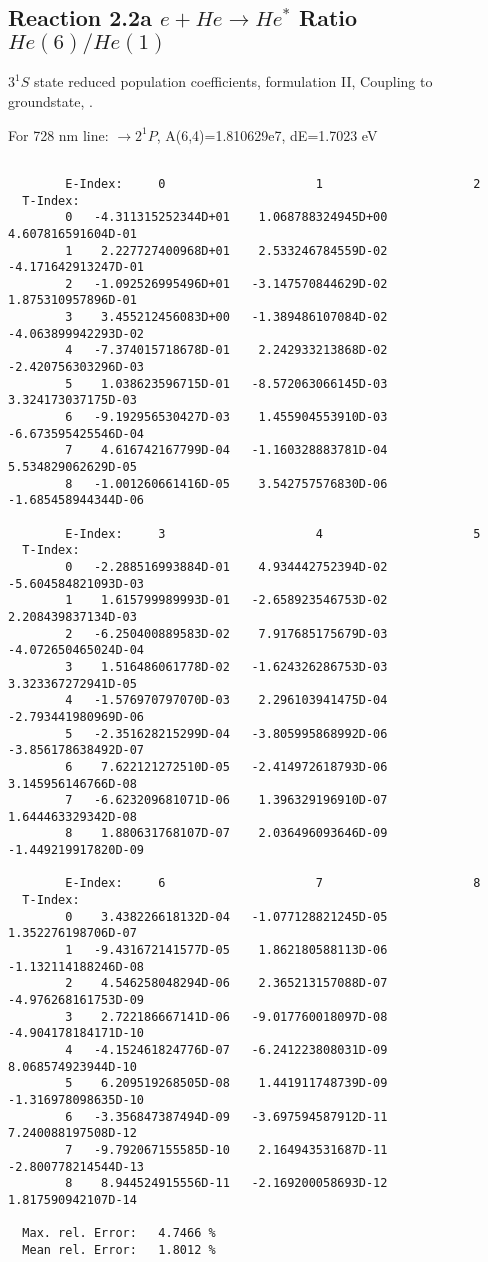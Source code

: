 \documentclass[12pt,dvipdfmx]{article}
\begin{document}
\subsection{
  Reaction 2.2a $e + He \rightarrow He^*  $ Ratio $He(6)/He(1)$
}

  $3^1S$ state
  reduced population coefficients, formulation II,
  Coupling to groundstate, \cite{kn:Fujimoto}.

  For 728 nm line:  $\rightarrow 2^1P$, A(6,4)=1.810629e7, dE=1.7023 eV

\begin{small}\begin{verbatim}

        E-Index:     0                     1                     2
  T-Index:
        0   -4.311315252344D+01    1.068788324945D+00    4.607816591604D-01
        1    2.227727400968D+01    2.533246784559D-02   -4.171642913247D-01
        2   -1.092526995496D+01   -3.147570844629D-02    1.875310957896D-01
        3    3.455212456083D+00   -1.389486107084D-02   -4.063899942293D-02
        4   -7.374015718678D-01    2.242933213868D-02   -2.420756303296D-03
        5    1.038623596715D-01   -8.572063066145D-03    3.324173037175D-03
        6   -9.192956530427D-03    1.455904553910D-03   -6.673595425546D-04
        7    4.616742167799D-04   -1.160328883781D-04    5.534829062629D-05
        8   -1.001260661416D-05    3.542757576830D-06   -1.685458944344D-06

        E-Index:     3                     4                     5
  T-Index:
        0   -2.288516993884D-01    4.934442752394D-02   -5.604584821093D-03
        1    1.615799989993D-01   -2.658923546753D-02    2.208439837134D-03
        2   -6.250400889583D-02    7.917685175679D-03   -4.072650465024D-04
        3    1.516486061778D-02   -1.624326286753D-03    3.323367272941D-05
        4   -1.576970797070D-03    2.296103941475D-04   -2.793441980969D-06
        5   -2.351628215299D-04   -3.805995868992D-06   -3.856178638492D-07
        6    7.622121272510D-05   -2.414972618793D-06    3.145956146766D-08
        7   -6.623209681071D-06    1.396329196910D-07    1.644463329342D-08
        8    1.880631768107D-07    2.036496093646D-09   -1.449219917820D-09

        E-Index:     6                     7                     8
  T-Index:
        0    3.438226618132D-04   -1.077128821245D-05    1.352276198706D-07
        1   -9.431672141577D-05    1.862180588113D-06   -1.132114188246D-08
        2    4.546258048294D-06    2.365213157088D-07   -4.976268161753D-09
        3    2.722186667141D-06   -9.017760018097D-08   -4.904178184171D-10
        4   -4.152461824776D-07   -6.241223808031D-09    8.068574923944D-10
        5    6.209519268505D-08    1.441911748739D-09   -1.316978098635D-10
        6   -3.356847387494D-09   -3.697594587912D-11    7.240088197508D-12
        7   -9.792067155585D-10    2.164943531687D-11   -2.800778214544D-13
        8    8.944524915556D-11   -2.169200058693D-12    1.817590942107D-14

  Max. rel. Error:   4.7466 %
  Mean rel. Error:   1.8012 %



\end{verbatim}\end{small}
\end{document}
